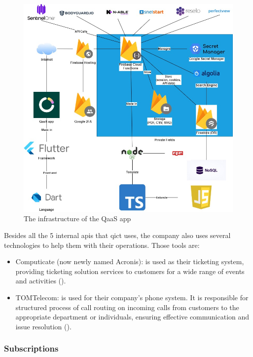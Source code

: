 \begin{figure}[H]
      \centering
      \includegraphics[width=1.0\textwidth]{Figures/QaaS App Infraastructure.jpg}
      \caption{The infrastructure of the QaaS app}
\end{figure}

Besides all the 5 internal \acrshort{api}s that \acrshort{qict} uses, the company also uses several technologies to help them with their
operations. Those tools are:

\begin{itemize}
      \item Computicate (now newly named Acronis): is used as their ticketing system, providing ticketing solution services to customers for
            a wide range of events and activities (\textit{\cite{computicate}}).
      \item TOMTelecom: is used for their company's phone system. It is responsible for structured process of call routing on incoming calls
            from customers to the appropriate department or individuals, ensuring effective communication and issue resolution
            (\textit{\cite{tomTelecom}}).
\end{itemize}

\subsubsection{Subscriptions}

